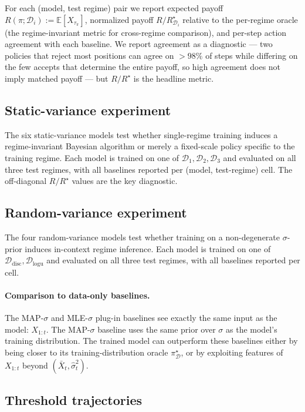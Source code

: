 \documentclass[11pt]{article}
\begin{document}
For each (model, test regime) pair we report expected payoff $R(\pi; \mathcal{D}_i) := \mathbb{E}[X_{\tau_\pi}]$, normalized payoff $R/R^\star_{\mathcal{D}_i}$ relative to the per-regime oracle (the regime-invariant metric for cross-regime comparison), and per-step action agreement with each baseline. We report agreement as a diagnostic --- two policies that reject most positions can agree on $> 98\%$ of steps while differing on the few accepts that determine the entire payoff, so high agreement does not imply matched payoff --- but $R/R^\star$ is the headline metric.

\subsection{Static-variance experiment}
\label{sec:exp-static}

The six static-variance models test whether single-regime training induces a regime-invariant Bayesian algorithm or merely a fixed-scale policy specific to the training regime. Each model is trained on one of $\mathcal{D}_1, \mathcal{D}_2, \mathcal{D}_3$ and evaluated on all three test regimes, with all baselines reported per (model, test-regime) cell. The off-diagonal $R/R^\star$ values are the key diagnostic.

\subsection{Random-variance experiment}
\label{sec:exp-random}

The four random-variance models test whether training on a non-degenerate $\sigma$-prior induces in-context regime inference. Each model is trained on one of $\mathcal{D}_{\mathrm{disc}}, \mathcal{D}_{\mathrm{logu}}$ and evaluated on all three test regimes, with all baselines reported per cell.

\paragraph{Comparison to data-only baselines.} The MAP-$\sigma$ and MLE-$\sigma$ plug-in baselines see exactly the same input as the model: $X_{1:t}$. The MAP-$\sigma$ baseline uses the same prior over $\sigma$ as the model's training distribution. The trained model can outperform these baselines either by being closer to its training-distribution oracle $\pi^\star_{\mathcal{D}}$, or by exploiting features of $X_{1:t}$ beyond $(\bar X_t, \hat\sigma_t^2)$.

\subsection{Threshold trajectories}
\label{sec:exp-thresh}
\end{document}
